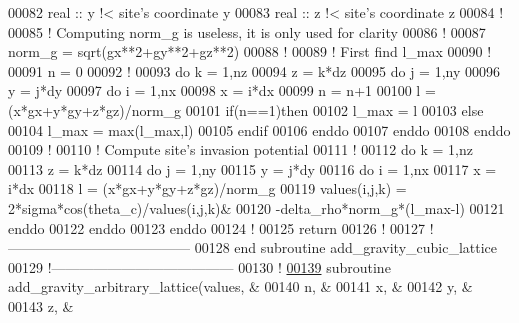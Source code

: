 \begin{DoxyCode}
00082     \textcolor{keywordtype}{real} :: y \textcolor{comment}{!< site's coordinate y}
00083     \textcolor{keywordtype}{real} :: z \textcolor{comment}{!< site's coordinate z}
00084     \textcolor{comment}{!}
00085     \textcolor{comment}{! Computing norm\_g is useless, it is only used for clarity}
00086     \textcolor{comment}{!}
00087     norm\_g = sqrt(gx**2+gy**2+gz**2)
00088     \textcolor{comment}{!}
00089     \textcolor{comment}{! First find l\_max}
00090     \textcolor{comment}{!}
00091     n = 0
00092     \textcolor{comment}{!}
00093     \textcolor{keyword}{do} k = 1,nz
00094        z = k*dz
00095        \textcolor{keyword}{do} j = 1,ny
00096           y = j*dy
00097           \textcolor{keyword}{do} i = 1,nx
00098              x = i*dx
00099              n = n+1
00100              l = (x*gx+y*gy+z*gz)/norm\_g
00101              \textcolor{keyword}{if}(n==1)\textcolor{keyword}{then}
00102                 l\_max = l
00103              \textcolor{keyword}{else}
00104                 l\_max = max(l\_max,l)
00105              \textcolor{keyword}{endif}
00106           \textcolor{keyword}{enddo}
00107        \textcolor{keyword}{enddo}
00108     \textcolor{keyword}{enddo}
00109     \textcolor{comment}{!}
00110     \textcolor{comment}{! Compute site's invasion potential}
00111     \textcolor{comment}{!}
00112     \textcolor{keyword}{do} k = 1,nz
00113        z = k*dz
00114        \textcolor{keyword}{do} j = 1,ny
00115           y = j*dy
00116           \textcolor{keyword}{do} i = 1,nx
00117              x = i*dx
00118              l = (x*gx+y*gy+z*gz)/norm\_g
00119              values(i,j,k) = 2*sigma*cos(theta\_c)/values(i,j,k)&
00120                             -delta\_rho*norm\_g*(l\_max-l)
00121           \textcolor{keyword}{enddo}
00122        \textcolor{keyword}{enddo}
00123     \textcolor{keyword}{enddo}
00124     \textcolor{comment}{! }
00125     return
00126     \textcolor{comment}{!}
00127   \textcolor{comment}{!---------------------------------------}
00128 \textcolor{keyword}{  end subroutine add\_gravity\_cubic\_lattice}
00129   \textcolor{comment}{!---------------------------------------}
00130   \textcolor{comment}{!}
\hypertarget{module__gravity_8f90_source_l00139}{}\hyperlink{classmodule__gravity_aec4d82af2ee63137ace94fec23131058}{00139}   \textcolor{keyword}{subroutine }add\_gravity\_arbitrary\_lattice(values,    &
00140                                            n,         &
00141                                            x,         &
00142                                            y,         &
00143                                            z,         &

\end{DoxyCode}
